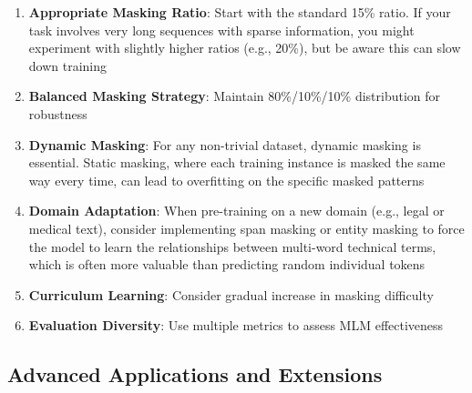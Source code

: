 \begin{enumerate}
\item \textbf{Appropriate Masking Ratio}: Start with the standard 15\% ratio. If your task involves very long sequences with sparse information, you might experiment with slightly higher ratios (e.g., 20\%), but be aware this can slow down training
\item \textbf{Balanced Masking Strategy}: Maintain 80\%/10\%/10\% distribution for robustness
\item \textbf{Dynamic Masking}: For any non-trivial dataset, dynamic masking is essential. Static masking, where each training instance is masked the same way every time, can lead to overfitting on the specific masked patterns
\item \textbf{Domain Adaptation}: When pre-training on a new domain (e.g., legal or medical text), consider implementing span masking or entity masking to force the model to learn the relationships between multi-word technical terms, which is often more valuable than predicting random individual tokens
\item \textbf{Curriculum Learning}: Consider gradual increase in masking difficulty
\item \textbf{Evaluation Diversity}: Use multiple metrics to assess MLM effectiveness
\end{enumerate}

\subsection{Advanced Applications and Extensions}


